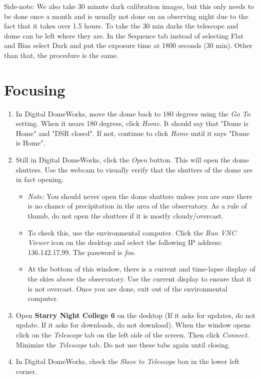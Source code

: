 \documentclass[11pt]{report}
\begin{document}
Side-note: We also take 30 minute dark calibration images, but this only needs to be done once a month and is usually not done on an observing night due to the fact that it takes over 1.5 hours. To take the 30 min darks the telescope and dome can be left where they are. In the Sequence tab instead of selecting Flat and Bias select Dark and put the exposure time at 1800 seconds (30 min). Other than that, the procedure is the same. 

\section{Focusing}

\begin{enumerate}
\item In Digital DomeWorks, move the dome back to 180 degrees using the \emph{Go To} setting. When it nears 180 degrees, click \emph{Home}. It should say that "Dome is Home" and "DSR closed". If not, continue to click \emph{Home} until it says "Dome is Home".
\item Still in Digital DomeWorks, click the \emph{Open} button. This will open the dome shutters. Use the webcam to visually verify that the shutters of the dome are in fact opening. 
\begin{itemize}
\item\emph{Note:} You should never open the dome shutters unless you are sure there is no chance of precipitation in the area of the observatory. As a rule of thumb, do not open the shutters if it is mostly cloudy/overcast.
\item To check this, use the environmental computer. Click the \emph{Run VNC Viewer} icon on the desktop and select the following IP address: 136.142.17.99. The password is \emph{foo}.
\item At the bottom of this window, there is a current and time-lapse display of the skies above the observatory. Use the current display to ensure that it is not overcast. Once you are done, exit out of the environmental computer.
\end{itemize}
\item Open {\bf Starry Night College 6} on the desktop (If it asks for updates, do not update. If it asks for downloads, do not download). When the window opens click on the \emph{Telescope} tab on the left side of the screen. Then click \emph{Connect}. Minimize the \emph{Telescope} tab. Do not use these tabs again until closing.
\item In Digital DomeWorks, check the \emph{Slave to Telescope} box in the lower left corner. 

\end{enumerate}
\end{document}
